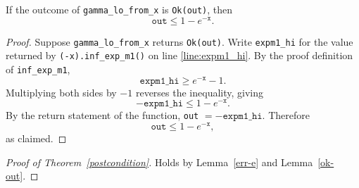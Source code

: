 \documentclass{article}
\begin{document}
\begin{lemma}
\label{ok-out}
If the outcome of \texttt{gamma\_lo\_from\_x} is \texttt{Ok(out)}, then
\[
\texttt{out} \le 1 - e^{-\texttt{x}}.
\]
\end{lemma}

\begin{proof}
Suppose \texttt{gamma\_lo\_from\_x} returns \texttt{Ok(out)}.
Write \texttt{expm1\_hi} for the value returned by \texttt{(-x).inf\_exp\_m1()} on line \ref{line:expm1_hi}.
By the proof definition of \texttt{inf\_exp\_m1},
\[
\texttt{expm1\_hi} \ge e^{-\texttt{x}} - 1.
\]
Multiplying both sides by $-1$ reverses the inequality, giving
\[
-\texttt{expm1\_hi} \le 1 - e^{-\texttt{x}}.
\]
By the return statement of the function, \texttt{out} $= -\texttt{expm1\_hi}$.
Therefore
\[
\texttt{out} \le 1 - e^{-\texttt{x}},
\]
as claimed.
\end{proof}

\begin{proof}[Proof of Theorem~\ref{postcondition}]
Holds by Lemma~\ref{err-e} and Lemma~\ref{ok-out}.
\end{proof}
\end{document}
